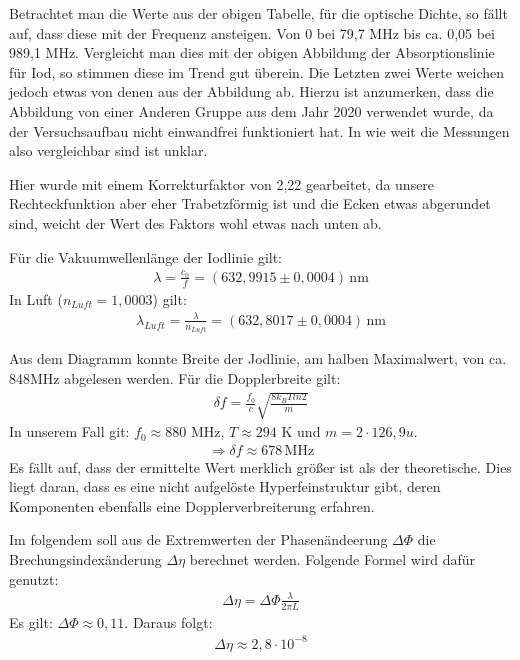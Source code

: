 Betrachtet man die Werte aus der obigen Tabelle, für die optische Dichte, so fällt auf, dass diese mit der Frequenz ansteigen. Von 0 bei 79,7 MHz bis ca. 0,05 bei 989,1 MHz. Vergleicht man dies mit der obigen Abbildung der Absorptionslinie für Iod, so stimmen diese im Trend gut überein. Die Letzten zwei Werte weichen jedoch etwas von denen aus der Abbildung ab. Hierzu ist anzumerken, dass die Abbildung von einer Anderen Gruppe aus dem Jahr 2020 verwendet wurde, da der Versuchsaufbau nicht einwandfrei funktioniert hat. In wie weit die Messungen also vergleichbar sind ist unklar.

Hier wurde mit einem Korrekturfaktor von 2,22 gearbeitet, da unsere Rechteckfunktion aber eher Trabetzförmig ist und die Ecken etwas abgerundet sind, weicht der Wert des Faktors wohl etwas nach unten ab.

Für die Vakuumwellenlänge der Iodlinie gilt:
\begin{gather}
    \lambda = \frac{c_0}{f} = (632,9915 \pm 0,0004) \, \text{nm}
\end{gather}
In Luft ($n_{Luft} = 1,0003$) gilt:
\begin{gather}
    \lambda_{Luft} = \frac{\lambda}{n_{Luft}} = (632,8017 \pm 0,0004)\, \text{nm}
\end{gather}

Aus dem Diagramm konnte Breite der Jodlinie, am halben Maximalwert, von ca. 848MHz abgelesen werden.
Für die Dopplerbreite gilt:
\begin{gather}
    \delta f = \frac{f_0}{c} \sqrt{\frac{8 k_B T ln2}{m}}
\end{gather}
In unserem Fall git: $f_0 \approx 880$ MHz,  $T \approx 294$ K und $m = 2 \cdot 126,9 u$.
\begin{gather}
    \Rightarrow \delta f \approx 678 \, \text{MHz}
\end{gather}
Es fällt auf, dass der ermittelte Wert merklich größer ist als der theoretische. Dies liegt daran, dass es eine nicht aufgelöste Hyperfeinstruktur gibt, deren Komponenten ebenfalls eine Dopplerverbreiterung erfahren.


Im folgendem soll aus de Extremwerten der Phasenändeerung $\Delta \Phi$ die Brechungsindexänderung $\Delta \eta$ berechnet werden. Folgende Formel wird dafür genutzt:
\begin{gather}
    \Delta \eta = \Delta \Phi \frac{\lambda}{2 \pi L}
\end{gather}
Es gilt: $\Delta \Phi \approx 0,11$. Daraus folgt:
\begin{gather}
    \Delta \eta \approx 2,8 \cdot 10^{-8}
\end{gather}

